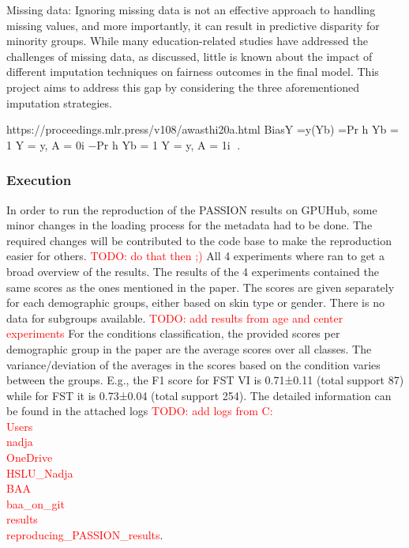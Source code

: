 \documentclass[12pt, a4paper, oneside]{book}   	%
\renewcommand{\todo}[1]{\textcolor{red}{TODO: #1}}
\renewcommand{\paragraph}[1]{%
	\subsubsection*{#1}%
}
\newif\ifrawcitationactive
\newcommand{\rawcitationusedend}{%
	\ifrawcitationactive
	\color{purple}  %
	\else
	\color{black}  %
	\fi
}
\begin{document}
		
		
		Missing data: Ignoring missing data is not an effective approach to handling missing values, and more importantly, it can result in predictive disparity for minority groups. While many education-related studies have addressed the challenges of missing data, as discussed, little is known about the impact of different imputation techniques on fairness outcomes in the final model. This project aims to address this gap by considering the three aforementioned imputation strategies.
		
		
		
		
		
		
		https://proceedings.mlr.press/v108/awasthi20a.html
		BiasY =y(Yb) =Pr h		Yb = 1	Y = y, A = 0i −Pr h	Yb = 1 		Y = y, A = 1i				.
		\rawcitationusedend
		
				
		
		
		\paragraph{Execution}
			In order to run the reproduction of the PASSION results on GPUHub, some minor changes in the loading process for the metadata had to be done. The required changes will be contributed to the code base to make the reproduction easier for others. \todo{do that then ;)}
			All 4 experiments where ran to get a broad overview of the results. The results of the 4 experiments contained the same scores as the ones mentioned in the paper. The scores are given separately for each demographic groups, either based on skin type or gender. There is no data for subgroups available. \todo{add results from age and center experiments}
			For the conditions classification, the provided scores per demographic group in the paper are the average scores over all classes. The variance/deviation of the averages in the scores based on the condition varies between the groups. E.g., the F1 score for \gls{FST} VI is 0.71±0.11 (total support 87) while for \gls{FST} it is 0.73±0.04 (total support 254). 
			The detailed information can be found in the attached logs \todo{add logs from C:\\Users\\nadja\\OneDrive\\HSLU\_Nadja\\BAA\\baa\_on\_git\\results\\reproducing\_PASSION\_results}.
			
\end{document}
